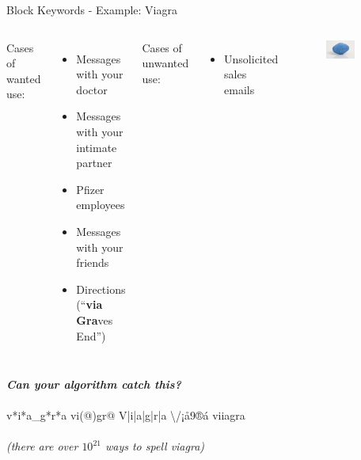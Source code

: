 \documentclass[nobackground,dvipsnames,table]{beamer}
\begin{document}
\begin{frame}{Block Keywords - Example: Viagra}
    \begin{columns}[T]
            Cases of wanted use:
            \begin{itemize}
                \item Messages with your doctor
                \item Messages with your intimate partner
                \item Pfizer employees
                \item Messages with your friends 
                \item Directions (“\textbf{via Gra}ves End”)
            \end{itemize}
            Cases of unwanted use:
            \begin{itemize}
                \item Unsolicited sales emails
            \end{itemize}
            \begin{figure}
                \includegraphics[width=0.6\textwidth]{viagra}
            \end{figure}
    \end{columns}
    \centering
    \textit{\textbf{Can your algorithm catch this?}} \\~\\
    v*i*a_g*r*a \hspace{0.04\textwidth}
    vi(@)gr@ \hspace{0.04\textwidth}
    V|i|a|g|r|a \hspace{0.04\textwidth}
    \textbackslash/¡å9®á \hspace{0.04\textwidth}
    viiagra\\~\\
    \textit{(there are over $10^{21}$ ways to spell viagra)}
\end{frame}
\end{document}
